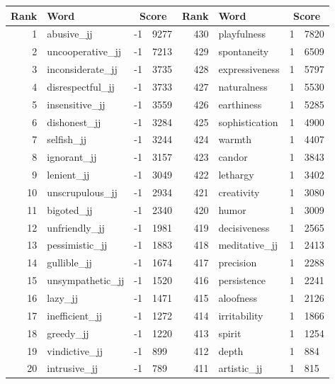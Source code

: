 \begin{table}[tbp]
    \begin{tabular}{| rlr@{.}l | rlr@{.}l |}
    \hline
    \textbf{Rank} & \textbf{Word} & \multicolumn{2}{c|}{\textbf{Score}} & \textbf{Rank} & \textbf{Word} & \multicolumn{2}{c|}{\textbf{Score}} \\
    \hline
    1 & abusive\_jj & -1 & 9277    &    430 & playfulness & 1 & 7820 \\
    2 & uncooperative\_jj & -1 & 7213    &    429 & spontaneity & 1 & 6509 \\
    3 & inconsiderate\_jj & -1 & 3735    &    428 & expressiveness & 1 & 5797 \\
    4 & disrespectful\_jj & -1 & 3733    &    427 & naturalness & 1 & 5530 \\
    5 & insensitive\_jj & -1 & 3559    &    426 & earthiness & 1 & 5285 \\
    6 & dishonest\_jj & -1 & 3284    &    425 & sophistication & 1 & 4900 \\
    7 & selfish\_jj & -1 & 3244    &    424 & warmth & 1 & 4407 \\
    8 & ignorant\_jj & -1 & 3157    &    423 & candor & 1 & 3843 \\
    9 & lenient\_jj & -1 & 3049    &    422 & lethargy & 1 & 3402 \\
    10 & unscrupulous\_jj & -1 & 2934    &    421 & creativity & 1 & 3080 \\
    11 & bigoted\_jj & -1 & 2340    &    420 & humor & 1 & 3009 \\
    12 & unfriendly\_jj & -1 & 1981    &    419 & decisiveness & 1 & 2565 \\
    13 & pessimistic\_jj & -1 & 1883    &    418 & meditative\_jj & 1 & 2413 \\
    14 & gullible\_jj & -1 & 1674    &    417 & precision & 1 & 2288 \\
    15 & unsympathetic\_jj & -1 & 1520    &    416 & persistence & 1 & 2241 \\
    16 & lazy\_jj & -1 & 1471    &    415 & aloofness & 1 & 2126 \\
    17 & inefficient\_jj & -1 & 1272    &    414 & irritability & 1 & 1866 \\
    18 & greedy\_jj & -1 & 1220    &    413 & spirit & 1 & 1254 \\
    19 & vindictive\_jj & -1 & 899    &    412 & depth & 1 & 884 \\
    20 & intrusive\_jj & -1 & 789    &    411 & artistic\_jj & 1 & 815 \\

\end{tabular}
\end{table}
